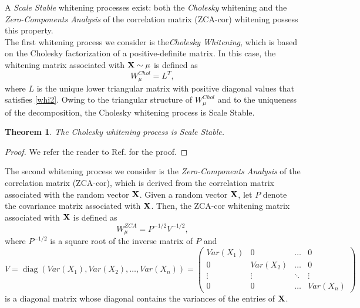 \documentclass{article}
\def\bX{{\bf X}}
\DeclareMathOperator{\diag}{diag}
\newtheorem{theorem}{Theorem}
\newtheorem{proof}{Proof}
\begin{document}
% 
A \emph{Scale Stable} whitening processes exist: both the \textit{Cholesky} whitening and the \textit{Zero-Components Analysis} of the correlation matrix (ZCA-cor) whitening possess this property.\cite{AGT}\\
% 

The first whitening process we consider is the\textit{Cholesky Whitening}, which is based on the Cholesky factorization of a positive-definite matrix. 
% 
In this case, the whitening matrix associated with $\bX\sim\mu$ is defined as 
\begin{equation}
\label{Chol}
W_\mu^{Chol} =L^T, 
\end{equation}
where $L$ is the unique lower triangular matrix with positive diagonal values that satisfies \eqref{whi2}. 
% 
Owing to the triangular structure of $W_\mu^{Chol}$ and to the uniqueness of the decomposition, the Cholesky whitening process is Scale Stable.
% 

\begin{theorem}
\label{thm:CholSS}
    The Cholesky whitening process is {Scale Stable}.
\end{theorem}


\begin{proof}
    We refer the reader to Ref. \cite{AGT} for the proof.
\end{proof}



% 
The second whitening process we consider is the \textit{Zero-Components Analysis} of the correlation matrix (ZCA-cor), which is derived from the correlation matrix associated with the random vector $\bX$.
%
Given a random vector $\bX$, let $P$ denote the covariance matrix associated with $\bX$.
% 
Then, the ZCA-cor whitening matrix associated with $\bX$ is defined as
% 
\begin{equation}
\label{ZCA-cor}
W_\mu^{ZCA} = P^{-1/2}V^{-1/2},
\end{equation}
% 
where $P^{-1/2}$ is a square root of the inverse matrix of $P$ and 
\[
    V=\diag(Var(X_1),Var(X_2),\dots,Var(X_n))=\begin{pmatrix}
        Var(X_1) &0  &\dots &0\\
        0 &Var(X_2) &\dots &0\\
        \vdots &\vdots &\ddots &\vdots\\
        0 &0 &\dots &Var(X_n)
    \end{pmatrix}
\]
is a diagonal matrix whose diagonal contains the variances of the entries of $\bX$.
% 
\end{document}
